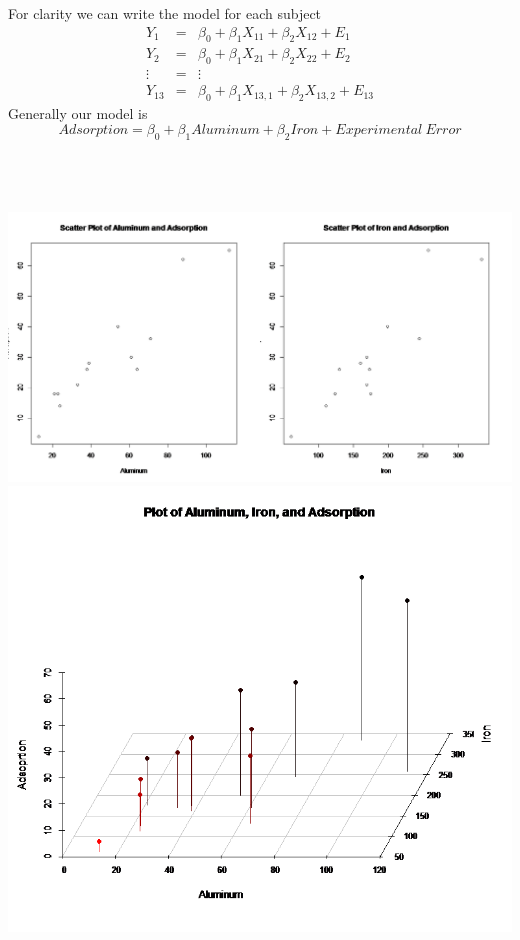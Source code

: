 For clarity we can write the model for each subject
\begin{eqnarray*}
Y_{1} &=& \beta_0 + \beta_1 X_{11} + \beta_2 X_{12} + E_{1}  \\
Y_{2} &=& \beta_0 + \beta_1 X_{21} + \beta_2 X_{22} + E_{2}  \\
\vdots & = & \vdots \\
Y_{13} &=& \beta_0 + \beta_1 X_{13,1} + \beta_2 X_{13,2} + E_{13}  
\end{eqnarray*}
Generally our model is 
$$Adsorption = \beta_0+\beta_1Aluminum+\beta_2Iron+Experimental~Error$$
~\\~\\~\\
\begin{center}
\includegraphics[scale=0.3]{scattermlr}\\
\includegraphics[scale=0.4]{scatter3dmlr}
\end{center}

